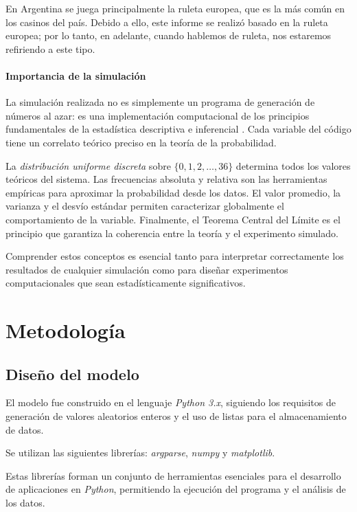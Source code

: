 \documentclass{article}
\begin{document}
En Argentina se juega principalmente la ruleta europea, que es la más común en los casinos del país.
Debido a ello, este informe se realizó basado en la ruleta europea; por lo tanto, en adelante, cuando
hablemos de ruleta, nos estaremos refiriendo a este tipo.

\paragraph{Importancia de la simulación}
La simulación realizada no es simplemente un programa de generación de números al 
azar: es una implementación computacional de los principios fundamentales de la estadística 
descriptiva e inferencial \cite{introducción_probabilidad}. Cada variable del código tiene 
un correlato teórico preciso en la teoría de la probabilidad.

La \textit{distribución uniforme discreta} \cite{distribucion_uniforme_discreta} sobre $\{0,1,2,\dots,36\}$ determina todos los valores teóricos del sistema. 
Las frecuencias absoluta y relativa son las herramientas empíricas para aproximar la probabilidad desde los datos. 
El valor promedio, la varianza y el desvío estándar permiten caracterizar globalmente el comportamiento de la variable. 
Finalmente, el Teorema Central del Límite es el principio que garantiza la coherencia entre la teoría y el experimento simulado.

Comprender estos conceptos es esencial tanto para interpretar correctamente los resultados de cualquier simulación como para 
diseñar experimentos computacionales que sean estadísticamente significativos.


\section{Metodología}
\label{sec:metodologia}

\subsection{Diseño del modelo}
El modelo fue construido en el lenguaje \textit{Python 3.x}, siguiendo los requisitos de generación de 
valores aleatorios enteros y el uso de listas para el almacenamiento de datos.

Se utilizan las siguientes librerías: \textit{argparse}, \textit{numpy} y \textit{matplotlib}.

Estas librerías forman un conjunto de herramientas esenciales para el desarrollo de aplicaciones en \textit{Python}, 
permitiendo la ejecución del programa y el análisis de los datos. 
\end{document}
